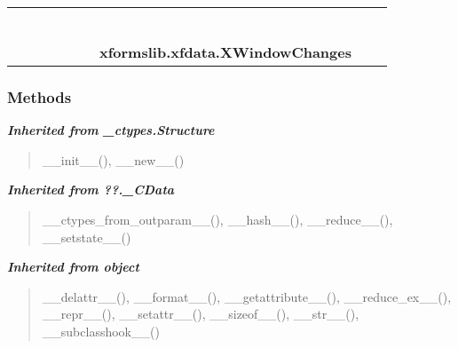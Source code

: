     \label{xformslib:xfdata:XWindowChanges}
\begin{tabular}{cccccccccc}
\multicolumn{2}{r}{\settowidth{\BCL}{object}\multirow{2}{\BCL}{object}}
&&
&&
&&
  \\\cline{3-3}
  &&\multicolumn{1}{c|}{}
&&
&&
&&
  \\
\multicolumn{4}{r}{\settowidth{\BCL}{??.\_CData}\multirow{2}{\BCL}{??.\_CData}}
&&
&&
  \\\cline{5-5}
  &&&&\multicolumn{1}{c|}{}
&&
&&
  \\
\multicolumn{6}{r}{\settowidth{\BCL}{\_ctypes.Structure}\multirow{2}{\BCL}{\_ctypes.Structure}}
&&
  \\\cline{7-7}
  &&&&&&\multicolumn{1}{c|}{}
&&
  \\
&&&&&&\multicolumn{2}{l}{\textbf{xformslib.xfdata.XWindowChanges}}
\end{tabular}



  \subsubsection{Methods}


\large{\textbf{\textit{Inherited from \_ctypes.Structure}}}

\begin{quote}
\_\_init\_\_(), \_\_new\_\_()
\end{quote}

\large{\textbf{\textit{Inherited from ??.\_CData}}}

\begin{quote}
\_\_ctypes\_from\_outparam\_\_(), \_\_hash\_\_(), \_\_reduce\_\_(), \_\_setstate\_\_()
\end{quote}

\large{\textbf{\textit{Inherited from object}}}

\begin{quote}
\_\_delattr\_\_(), \_\_format\_\_(), \_\_getattribute\_\_(), \_\_reduce\_ex\_\_(), \_\_repr\_\_(), \_\_setattr\_\_(), \_\_sizeof\_\_(), \_\_str\_\_(), \_\_subclasshook\_\_()
\end{quote}

